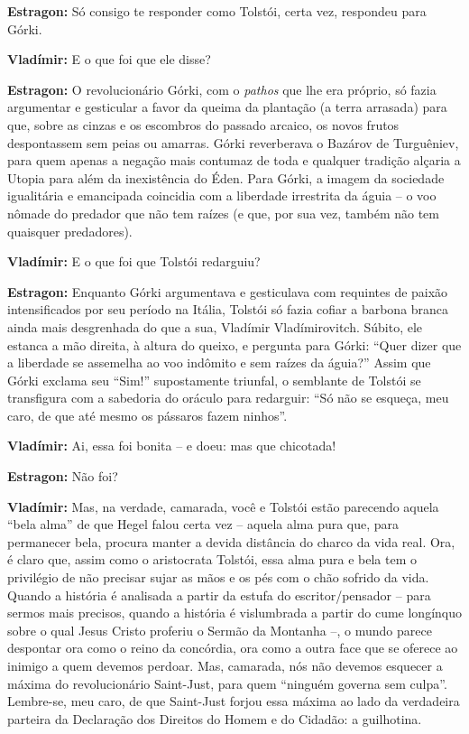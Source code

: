 \textbf{Estragon:} Só consigo te responder como Tolstói, certa vez,
respondeu para Górki.

\textbf{Vladímir:} E o que foi que ele disse?

\textbf{Estragon:} O revolucionário Górki, com o \emph{pathos} que lhe
era próprio, só fazia argumentar e gesticular a favor da queima da
plantação (a terra arrasada) para que, sobre as cinzas e os escombros do
passado arcaico, os novos frutos despontassem sem peias ou amarras.
Górki reverberava o Bazárov de Turguêniev, para quem apenas a negação
mais contumaz de toda e qualquer tradição alçaria a Utopia para além da
inexistência do Éden. Para Górki, a imagem da sociedade igualitária e
emancipada coincidia com a liberdade irrestrita da águia -- o voo nômade
do predador que não tem raízes (e que, por sua vez, também não tem
quaisquer predadores).

\textbf{Vladímir:} E o que foi que Tolstói redarguiu?

\textbf{Estragon:} Enquanto Górki argumentava e gesticulava com
requintes de paixão intensificados por seu período na Itália, Tolstói só
fazia cofiar a barbona branca ainda mais desgrenhada do que a sua,
Vladímir Vladímirovitch. Súbito, ele estanca a mão direita, à altura do
queixo, e pergunta para Górki: ``Quer dizer que a liberdade se assemelha
ao voo indômito e sem raízes da águia?'' Assim que Górki exclama seu
``Sim!'' supostamente triunfal, o semblante de Tolstói se transfigura
com a sabedoria do oráculo para redarguir: ``Só não se esqueça, meu
caro, de que até mesmo os pássaros fazem ninhos''.

\textbf{Vladímir:} Ai, essa foi bonita -- e doeu: mas que chicotada!

\textbf{Estragon:} Não foi?

\textbf{Vladímir:} Mas, na verdade, camarada, você e Tolstói estão
parecendo aquela ``bela alma'' de que Hegel falou certa vez -- aquela
alma pura que, para permanecer bela, procura manter a devida distância
do charco da vida real. Ora, é claro que, assim como o aristocrata
Tolstói, essa alma pura e bela tem o privilégio de não precisar sujar as
mãos e os pés com o chão sofrido da vida. Quando a história é analisada
a partir da estufa do escritor/pensador -- para sermos mais precisos,
quando a história é vislumbrada a partir do cume longínquo sobre o qual
Jesus Cristo proferiu o Sermão da Montanha --, o mundo parece despontar
ora como o reino da concórdia, ora como a outra face que se oferece ao
inimigo a quem devemos perdoar. Mas, camarada, nós não devemos esquecer
a máxima do revolucionário Saint-Just, para quem ``ninguém governa sem
culpa''. Lembre-se, meu caro, de que Saint-Just forjou essa máxima ao
lado da verdadeira parteira da Declaração dos Direitos do Homem e do
Cidadão: a guilhotina.

